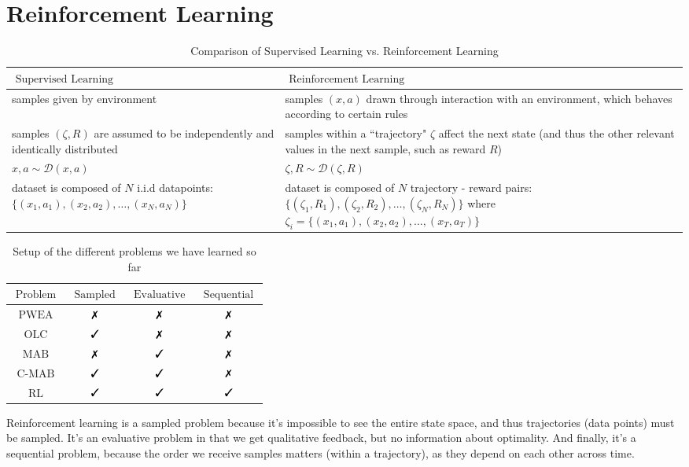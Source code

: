 \documentclass[11pt]{article}
\newcommand{\xmark}{\text{\ding{55}}}
\newcommand{\cmark}{\text{\ding{51}}}
\begin{document}
\section{Reinforcement Learning}
\begin{table}[h!]
    \centering
    \begin{tabular}{|p{.45\linewidth}|p{.45\linewidth}|}
        \hline $\text { Supervised Learning }$ &  $\text { Reinforcement Learning }$ \\
        \hline  samples given by environment & samples $(x, a)$ drawn through interaction with an environment, which behaves according to certain rules \\ 
        
        samples $(\zeta, R)$ are assumed to be independently and identically distributed & samples within a ``trajectory" $\zeta$ affect the next state (and thus the other relevant values in the next sample, such as reward $R$) \\
        $x, a \sim \mathcal{D} (x,a) $ & $\zeta, R \sim \mathcal{D}(\zeta, R)$ \\
        dataset is composed of $N$ i.i.d datapoints: $\{ (x_1, a_1), (x_2, a_2), \dots, (x_N, a_N) \}$  &     dataset is composed of $N$ trajectory - reward pairs: $\{ (\zeta_1, R_1), (\zeta_2, R_2), \dots, (\zeta_N, R_N) \}$ where $\zeta_i = \{ (x_1, a_1), (x_2, a_2), \dots, (x_T, a_T) \}$ \\
        \hline
    \end{tabular}
    \caption{Comparison of Supervised Learning vs. Reinforcement Learning \cite{slides, littman2015reinforcement,sutton }}
    \label{tab:2}
\end{table}


\begin{table}[h!]
    \centering
    \begin{tabular}{|c|c|c|c|}
        \hline $\text { Problem }$ &  $\text { Sampled }$ & $\text { Evaluative }$ & $\text { Sequential }$ \\
        \hline $\text { PWEA }$ &     $\xmark$ & $\xmark$ & $\xmark$ \\
        \hline $\text { OLC }$ &      $\cmark$ & $\xmark$ & $\xmark$ \\
        \hline $\text { MAB }$ &      $\xmark$ &        $\cmark$ & $\xmark$ \\
        \hline $\text { C-MAB }$ &    $\cmark$ & $\cmark$ & $\xmark$ \\
        \hline $\text { RL }$ &      $\cmark$ & $\cmark$ & $\cmark$ \\
        \hline
    \end{tabular}
    \caption{Setup of the different problems we have learned so far}
    \label{tab:my_label}
\end{table}
Reinforcement learning is a sampled problem because it's impossible to see the entire state space, and thus trajectories (data points) must be sampled. It's an evaluative problem in that we get qualitative feedback, but no information about optimality. And finally, it's a sequential problem, because the order we receive samples matters (within a trajectory), as they depend on each other across time.
\end{document}
